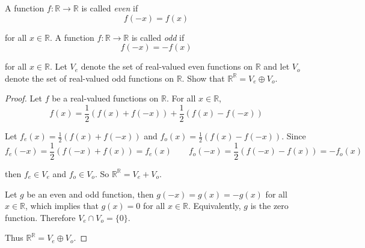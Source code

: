 \begin{exercise}
    A function $f: \mathbb{R}\to \mathbb{R}$ is called \textit{even} if
    \[
        f(-x) = f(x)
    \]

    for all $x\in\mathbb{R}$. A function $f: \mathbb{R}\to \mathbb{R}$ is called \textit{odd} if
    \[
        f(-x) = -f(x)
    \]

    for all $x\in\mathbb{R}$. Let $V_{e}$ denote the set of real-valued even functions on $\mathbb{R}$ and let $V_{o}$ denote the set of real-valued odd functions on $\mathbb{R}$. Show that $\mathbb{R}^{\mathbb{R}} = V_{e}\oplus V_{o}$.
\end{exercise}

\begin{proof}
    Let $f$ be a real-valued functions on $\mathbb{R}$. For all $x\in\mathbb{R}$,
    \[
        f(x) = \frac{1}{2}(f(x) + f(-x)) + \frac{1}{2}(f(x) - f(-x))
    \]

    Let $f_{e}(x) = \frac{1}{2}(f(x) + f(-x))$ and $f_{o}(x) = \frac{1}{2}(f(x) - f(-x))$. Since
    \[
        f_{e}(-x) = \frac{1}{2}(f(-x) + f(x)) = f_{e}(x)\qquad f_{o}(-x) = \frac{1}{2}(f(-x) - f(x)) = -f_{o}(x)
    \]

    then $f_{e}\in V_{e}$ and $f_{o}\in V_{o}$. So $\mathbb{R}^{\mathbb{R}} = V_{e} + V_{o}$.

    Let $g$ be an even and odd function, then $g(-x) = g(x) = -g(x)$ for all $x\in\mathbb{R}$, which implies that $g(x) = 0$ for all $x\in\mathbb{R}$. Equivalently, $g$ is the zero function. Therefore $V_{e}\cap V_{o} = \{ 0 \}$.

    Thus $\mathbb{R}^{\mathbb{R}} = V_{e}\oplus V_{o}$.
\end{proof}
